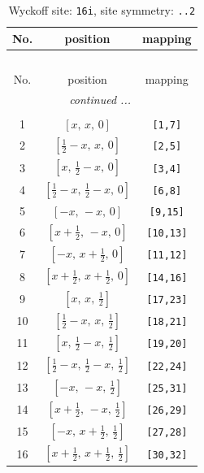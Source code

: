 \documentclass[fleqn,8pt]{jsarticle}
\begin{document}
\begin{longtable}{ccc}
\caption{Wyckoff site: {\tt 16i}, site symmetry: {\tt ..2}}
 \\
 \hline \hline
No. & position & mapping \\ \hline \endfirsthead

\multicolumn{2}{l}{\tablename\ \thetable{}} \\
 \hline \hline
No. & position & mapping \\ \hline \endhead

 \hline \hline
\multicolumn{2}{r}{\footnotesize\it continued ...} \\ \endfoot

 \hline \hline
\multicolumn{2}{r}{} \\ \endlastfoot

1 & $\left[ x,\, x,\, 0 \right]$ & {\tt [1,7]} \\ \hline
2 & $\left[ \frac{1}{2} - x,\, x,\, 0 \right]$ & {\tt [2,5]} \\ \hline
3 & $\left[ x,\, \frac{1}{2} - x,\, 0 \right]$ & {\tt [3,4]} \\ \hline
4 & $\left[ \frac{1}{2} - x,\, \frac{1}{2} - x,\, 0 \right]$ & {\tt [6,8]} \\ \hline
5 & $\left[ - x,\, - x,\, 0 \right]$ & {\tt [9,15]} \\ \hline
6 & $\left[ x + \frac{1}{2},\, - x,\, 0 \right]$ & {\tt [10,13]} \\ \hline
7 & $\left[ - x,\, x + \frac{1}{2},\, 0 \right]$ & {\tt [11,12]} \\ \hline
8 & $\left[ x + \frac{1}{2},\, x + \frac{1}{2},\, 0 \right]$ & {\tt [14,16]} \\ \hline
9 & $\left[ x,\, x,\, \frac{1}{2} \right]$ & {\tt [17,23]} \\ \hline
10 & $\left[ \frac{1}{2} - x,\, x,\, \frac{1}{2} \right]$ & {\tt [18,21]} \\ \hline
11 & $\left[ x,\, \frac{1}{2} - x,\, \frac{1}{2} \right]$ & {\tt [19,20]} \\ \hline
12 & $\left[ \frac{1}{2} - x,\, \frac{1}{2} - x,\, \frac{1}{2} \right]$ & {\tt [22,24]} \\ \hline
13 & $\left[ - x,\, - x,\, \frac{1}{2} \right]$ & {\tt [25,31]} \\ \hline
14 & $\left[ x + \frac{1}{2},\, - x,\, \frac{1}{2} \right]$ & {\tt [26,29]} \\ \hline
15 & $\left[ - x,\, x + \frac{1}{2},\, \frac{1}{2} \right]$ & {\tt [27,28]} \\ \hline
16 & $\left[ x + \frac{1}{2},\, x + \frac{1}{2},\, \frac{1}{2} \right]$ & {\tt [30,32]} \\
\end{longtable}
\end{document}
